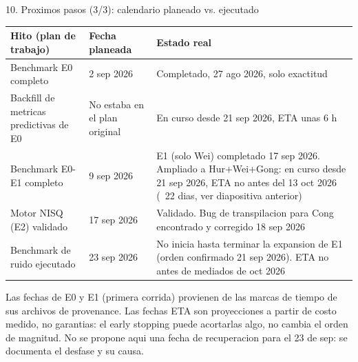 \documentclass[aspectratio=169]{beamer}
\newcommand{\bandedtable}{\rowcolors{2}{white}{bmRowAlt}}
\begin{document}
\begin{frame}{10. Proximos pasos (3/3): calendario planeado vs. ejecutado}
  \scriptsize
  \bandedtable
  \begin{tabular}{@{}p{3.6cm}p{2.4cm}p{6.4cm}@{}}
    \toprule
    \textbf{Hito (plan de trabajo)} & \textbf{Fecha planeada} & \textbf{Estado real} \\
    \midrule
    Benchmark E0 completo & 2 sep 2026 & Completado, 27 ago 2026, solo exactitud \\
    Backfill de metricas predictivas de E0 & No estaba en el plan original & En curso desde 21 sep 2026, ETA unas 6 h \\
    Benchmark E0-E1 completo & 9 sep 2026 & E1 (solo Wei) completado 17 sep 2026. Ampliado a Hur+Wei+Gong: en curso desde 21 sep 2026, ETA no antes del 13 oct 2026 (~22 dias, ver diapositiva anterior) \\
    Motor NISQ (E2) validado & 17 sep 2026 & Validado. Bug de transpilacion para Cong encontrado y corregido 18 sep 2026 \\
    Benchmark de ruido ejecutado & 23 sep 2026 & No inicia hasta terminar la expansion de E1 (orden confirmado 21 sep 2026). ETA no antes de mediados de oct 2026 \\
    \bottomrule
  \end{tabular}

  \vspace{8pt}
  Las fechas de E0 y E1 (primera corrida) provienen de las marcas de tiempo
  de sus archivos de provenance. Las fechas ETA son proyecciones a partir
  de costo medido, no garantias: el early stopping puede acortarlas algo,
  no cambia el orden de magnitud. No se propone aqui una fecha de
  recuperacion para el 23 de sep: se documenta el desfase y su causa.
\end{frame}
\end{document}
